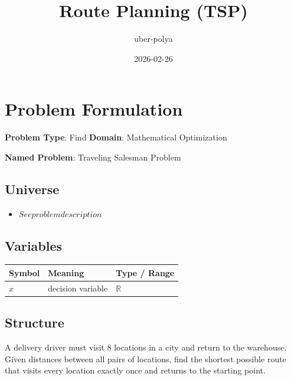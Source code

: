 \documentclass[11pt, a4paper]{article}
\title{Route Planning (TSP)}
\author{uber-polya}
\date{2026-02-26}
\begin{document}
\maketitle
\tableofcontents
\newpage

\section{Problem Formulation}

\begin{polyamodel}

\textbf{Problem Type}: Find \hfill
\textbf{Domain}: Mathematical Optimization

\textbf{Named Problem}: Traveling Salesman Problem

\end{polyamodel}

\subsection{Universe}

\begin{itemize}
  \item $See problem description$
\end{itemize}

\subsection{Variables}

\begin{longtable}{lll}
\toprule
\textbf{Symbol} & \textbf{Meaning} & \textbf{Type / Range} \\
\midrule
\endhead
$x$ & decision variable & $\mathbb{{R}}$ \\
\bottomrule
\end{longtable}

\subsection{Structure}

A delivery driver must visit 8 locations in a city and return to the warehouse.
Given distances between all pairs of locations, find the shortest possible route
that visits every location exactly once and returns to the starting point.
\end{document}

